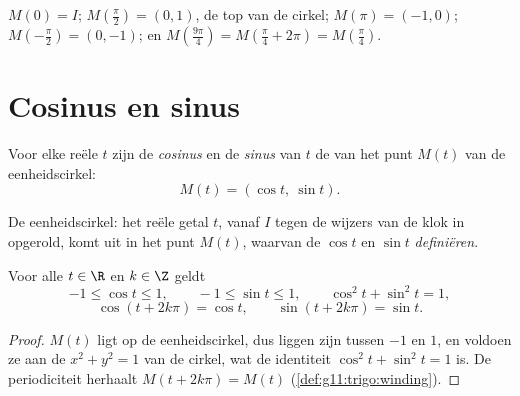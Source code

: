 \begin{example}
$M(0) = I$; $M\!\left(\frac{\pi}{2}\right) = (0, 1)$, de top van de cirkel;
$M(\pi) = (-1, 0)$; $M\!\left(-\frac{\pi}{2}\right) = (0, -1)$; en
$M\!\left(\frac{9\pi}{4}\right) = M\!\left(\frac{\pi}{4} + 2\pi\right) =
M\!\left(\frac{\pi}{4}\right)$.
\end{example}

\section{Cosinus en sinus}

\begin{definition}\label{def:g11:trigo:cossin}
Voor elke reële $t$ zijn de \emph{cosinus} en de
\emph{sinus} van $t$ de  van het punt $M(t)$ van de
eenheidscirkel:
\[
M(t) = (\cos t,\ \sin t).
\]
\end{definition}

\begin{omfigure}

{\small De eenheidscirkel: het reële getal $t$, vanaf $I$ tegen de wijzers
van de klok in opgerold, komt uit in het punt $M(t)$, waarvan de 
$\cos t$ en $\sin t$ \emph{definiëren}.}
\end{omfigure}

\begin{proposition}\label{prop:g11:trigo:first}
Voor alle $t \in \R$ en $k \in \Z$ geldt
\[
-1 \leq \cos t \leq 1, \qquad
-1 \leq \sin t \leq 1, \qquad
\cos^2 t + \sin^2 t = 1,
\]
\[
\cos(t + 2k\pi) = \cos t, \qquad \sin(t + 2k\pi) = \sin t .
\]
\end{proposition}

\begin{proof}
$M(t)$ ligt op de eenheidscirkel, dus liggen zijn  tussen $-1$ en
$1$, en voldoen ze aan de  $x^2 + y^2 = 1$ van de cirkel, wat de
identiteit $\cos^2 t + \sin^2 t = 1$ is. De periodiciteit herhaalt
$M(t + 2k\pi) = M(t)$ (\cref{def:g11:trigo:winding}).
\end{proof}

